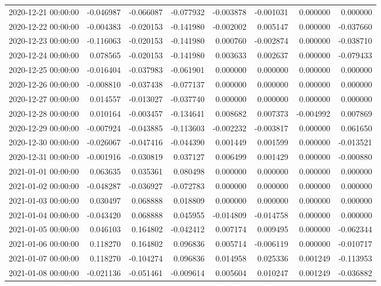 \begin{tabular}{lrrrrrrr}
2020-12-21 00:00:00 & -0.046987 & -0.066087 & -0.077932 & -0.003878 & -0.001031 & 0.000000 & 0.000000 \\
2020-12-22 00:00:00 & -0.004383 & -0.020153 & -0.141980 & -0.002002 & 0.005147 & 0.000000 & -0.037660 \\
2020-12-23 00:00:00 & -0.116063 & -0.020153 & -0.141980 & 0.000760 & -0.002874 & 0.000000 & -0.038710 \\
2020-12-24 00:00:00 & 0.078565 & -0.020153 & -0.141980 & 0.003633 & 0.002637 & 0.000000 & -0.079433 \\
2020-12-25 00:00:00 & -0.016404 & -0.037983 & -0.061901 & 0.000000 & 0.000000 & 0.000000 & 0.000000 \\
2020-12-26 00:00:00 & -0.008810 & -0.037438 & -0.077137 & 0.000000 & 0.000000 & 0.000000 & 0.000000 \\
2020-12-27 00:00:00 & 0.014557 & -0.013027 & -0.037740 & 0.000000 & 0.000000 & 0.000000 & 0.000000 \\
2020-12-28 00:00:00 & 0.010164 & -0.003457 & -0.134641 & 0.008682 & 0.007373 & -0.004992 & 0.007869 \\
2020-12-29 00:00:00 & -0.007924 & -0.043885 & -0.113603 & -0.002232 & -0.003817 & 0.000000 & 0.061650 \\
2020-12-30 00:00:00 & -0.026067 & -0.047416 & -0.044390 & 0.001449 & 0.001599 & 0.000000 & -0.013521 \\
2020-12-31 00:00:00 & -0.001916 & -0.030819 & 0.037127 & 0.006499 & 0.001429 & 0.000000 & -0.000880 \\
2021-01-01 00:00:00 & 0.063635 & 0.035361 & 0.080498 & 0.000000 & 0.000000 & 0.000000 & 0.000000 \\
2021-01-02 00:00:00 & -0.048287 & -0.036927 & -0.072783 & 0.000000 & 0.000000 & 0.000000 & 0.000000 \\
2021-01-03 00:00:00 & 0.030497 & 0.068888 & 0.018809 & 0.000000 & 0.000000 & 0.000000 & 0.000000 \\
2021-01-04 00:00:00 & -0.043420 & 0.068888 & 0.045955 & -0.014809 & -0.014758 & 0.000000 & 0.000000 \\
2021-01-05 00:00:00 & 0.046103 & 0.164802 & -0.042412 & 0.007174 & 0.009495 & 0.000000 & -0.062344 \\
2021-01-06 00:00:00 & 0.118270 & 0.164802 & 0.096836 & 0.005714 & -0.006119 & 0.000000 & -0.010717 \\
2021-01-07 00:00:00 & 0.118270 & -0.104274 & 0.096836 & 0.014958 & 0.025336 & 0.001249 & -0.113953 \\
2021-01-08 00:00:00 & -0.021136 & -0.051461 & -0.009614 & 0.005604 & 0.010247 & 0.001249 & -0.036882 \\

\end{tabular}
